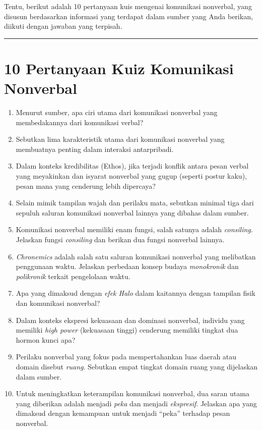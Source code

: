 \documentclass[
  letterpaper,
  DIV=11,
  numbers=noendperiod]{scrreprt}
\providecommand{\tightlist}{%
  \setlength{\itemsep}{0pt}\setlength{\parskip}{0pt}}
\begin{document}
Tentu, berikut adalah 10 pertanyaan kuis mengenai komunikasi nonverbal,
yang disusun berdasarkan informasi yang terdapat dalam sumber yang Anda
berikan, diikuti dengan jawaban yang terpisah.

\begin{center}\rule{0.5\linewidth}{0.5pt}\end{center}

\section{10 Pertanyaan Kuiz Komunikasi
Nonverbal}\label{pertanyaan-kuiz-komunikasi-nonverbal}

\begin{enumerate}
\def\labelenumi{\arabic{enumi}.}
\tightlist
\item
  Menurut sumber, apa ciri utama dari komunikasi nonverbal yang
  membedakannya dari komunikasi verbal?
\item
  Sebutkan lima karakteristik utama dari komunikasi nonverbal yang
  membuatnya penting dalam interaksi antarpribadi.
\item
  Dalam konteks kredibilitas (Ethos), jika terjadi konflik antara pesan
  verbal yang meyakinkan dan isyarat nonverbal yang gugup (seperti
  postur kaku), pesan mana yang cenderung lebih dipercaya?
\item
  Selain mimik tampilan wajah dan perilaku mata, sebutkan minimal tiga
  dari sepuluh saluran komunikasi nonverbal lainnya yang dibahas dalam
  sumber.
\item
  Komunikasi nonverbal memiliki enam fungsi, salah satunya adalah
  \emph{consiling}. Jelaskan fungsi \emph{consiling} dan berikan dua
  fungsi nonverbal lainnya.
\item
  \emph{Chronemics} adalah salah satu saluran komunikasi nonverbal yang
  melibatkan penggunaan waktu. Jelaskan perbedaan konsep budaya
  \emph{monokronik} dan \emph{polikronik} terkait pengelolaan waktu.
\item
  Apa yang dimaksud dengan \emph{efek Halo} dalam kaitannya dengan
  tampilan fisik dan komunikasi nonverbal?
\item
  Dalam konteks ekspresi kekuasaan dan dominasi nonverbal, individu yang
  memiliki \emph{high power} (kekuasaan tinggi) cenderung memiliki
  tingkat dua hormon kunci apa?
\item
  Perilaku nonverbal yang fokus pada mempertahankan luas daerah atau
  domain disebut \emph{ruang}. Sebutkan empat tingkat domain ruang yang
  dijelaskan dalam sumber.
\item
  Untuk meningkatkan keterampilan komunikasi nonverbal, dua saran utama
  yang diberikan adalah menjadi \emph{peka} dan menjadi
  \emph{ekspresif}. Jelaskan apa yang dimaksud dengan kemampuan untuk
  menjadi ``peka'' terhadap pesan nonverbal.
\end{enumerate}
\end{document}
